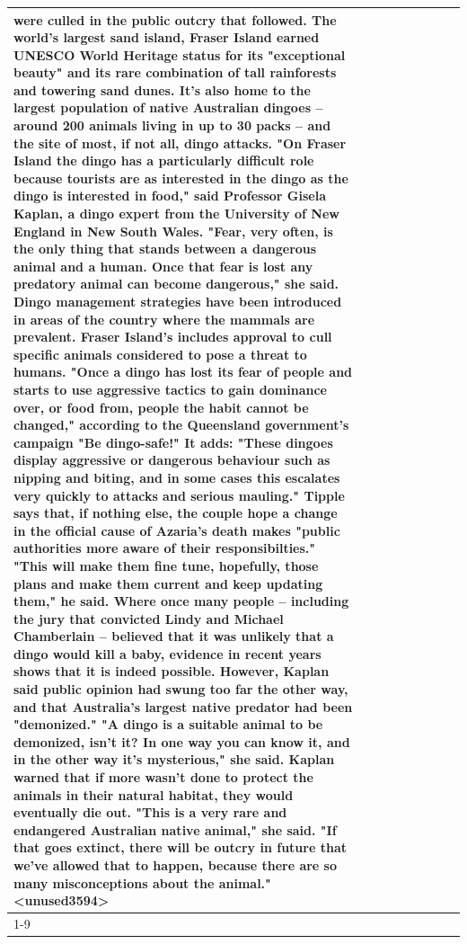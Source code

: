 \begin{table}[H]
\begin{tabular}{lllrlllll}
were culled in the public outcry that followed. The world's largest sand island, Fraser Island earned UNESCO World Heritage status for its "exceptional beauty" and its rare combination of tall rainforests and towering sand dunes. It's also home to the largest population of native Australian dingoes -- around 200 animals living in up to 30 packs -- and the site of most, if not all, dingo attacks. "On Fraser Island the dingo has a particularly difficult role because tourists are as interested in the dingo as the dingo is interested in food," said Professor Gisela Kaplan, a dingo expert from the University of New England in New South Wales. "Fear, very often, is the only thing that stands between a dangerous animal and a human. Once that fear is lost any predatory animal can become dangerous," she said. Dingo management strategies have been introduced in areas of the country where the mammals are prevalent. Fraser Island's includes approval to cull specific animals considered to pose a threat to humans. "Once a dingo has lost its fear of people and starts to use aggressive tactics to gain dominance over, or food from, people the habit cannot be changed," according to the Queensland government's campaign "Be dingo-safe!" It adds: "These dingoes display aggressive or dangerous behaviour such as nipping and biting, and in some cases this escalates very quickly to attacks and serious mauling." Tipple says that, if nothing else, the couple hope a change in the official cause of Azaria's death makes "public authorities more aware of their responsibilties." "This will make them fine tune, hopefully, those plans and make them current and keep updating them," he said. Where once many people -- including the jury that convicted Lindy and Michael Chamberlain -- believed that it was unlikely that a dingo would kill a baby, evidence in recent years shows that it is indeed possible. However, Kaplan said public opinion had swung too far the other way, and that Australia's largest native predator had been "demonized." "A dingo is a suitable animal to be demonized, isn't it? In one way you can know it, and in the other way it's mysterious," she said. Kaplan warned that if more wasn't done to protect the animals in their natural habitat, they would eventually die out. "This is a very rare and endangered Australian native animal," she said. "If that goes extinct, there will be outcry in future that we've allowed that to happen, because there are so many misconceptions about the animal."<unused3594> \\
\cline{1-9}

\end{tabular}
\end{table}
